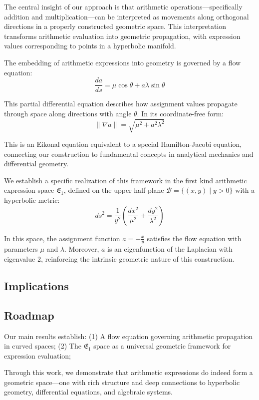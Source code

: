 The central insight of our approach is that arithmetic operations—specifically addition and multiplication—can be interpreted as movements along orthogonal directions in a properly constructed geometric space. This interpretation transforms arithmetic evaluation into geometric propagation, with expression values corresponding to points in a hyperbolic manifold.

The embedding of arithmetic expressions into geometry is governed by a flow equation:
\begin{equation}
\frac{da}{ds} = \mu \cos \theta + a \lambda \sin \theta
\end{equation}

This partial differential equation describes how assignment values propagate through space along directions with angle $\theta$. In its coordinate-free form:
\begin{equation}
\|\nabla a\| = \sqrt{\mu^2 + a^2\lambda^2}
\end{equation}

This is an Eikonal equation equivalent to a special Hamilton-Jacobi equation, connecting our construction to fundamental concepts in analytical mechanics and differential geometry.

We establish a specific realization of this framework in the first kind arithmetic expression space $\mathfrak{E}_1$, defined on the upper half-plane $\mathcal{B} = \{(x,y) \mid y > 0\}$ with a hyperbolic metric:
\begin{equation}
ds^2 = \frac{1}{y^2}\left(\frac{dx^2}{\mu^2} + \frac{dy^2}{\lambda^2}\right)
\end{equation}

In this space, the assignment function $a = -\frac{x}{y}$ satisfies the flow equation with parameters $\mu$ and $\lambda$. Moreover, $a$ is an eigenfunction of the Laplacian with eigenvalue 2, reinforcing the intrinsic geometric nature of this construction.

\subsection{Implications}

\subsection{Roadmap}

Our main results establish: (1) A flow equation governing arithmetic propagation in curved spaces; (2) The $\mathfrak{E}_1$ space as a universal geometric framework for expression evaluation;

Through this work, we demonstrate that arithmetic expressions do indeed form a geometric space—one with rich structure and deep connections to hyperbolic geometry, differential equations, and algebraic systems.
